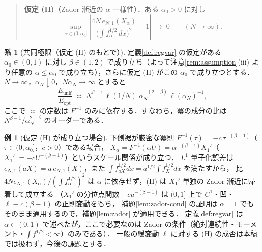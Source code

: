 \documentclass[a4paper,10pt]{jsarticle}
\theoremstyle{definition}
\newtheorem{corollary}{系}[section]
\newtheorem{example}{例}[section]
\newcommand{\Finv}{F^{-1}}
\newcommand{\eN}{e_{N,1}}
\newcommand{\Eunif}{E_{\mathrm{unif}}}
\newcommand{\Eopt}{E_{\mathrm{opt}}}
\begin{document}
\begin{quote}
\textbf{仮定 (H)}（Zador 漸近の $\alpha$ 一様性）．ある $\alpha_0>0$ に対し
\begin{equation*}
  \sup_{\alpha\in(0,\alpha_0]}\left|\frac{4N\,\eN(X_\alpha)}{\bigl(\int f_\alpha^{1/2}\,dx\bigr)^{2}}-1\right|\;\longrightarrow\;0\qquad(N\to\infty).
\end{equation*}
\end{quote}

\begin{corollary}[共同極限（仮定 (H) のもとで）]
\label{cor:joint}
定義\ref{def:regvar} の仮定がある $\alpha_0\in(0,1)$ に対し $\beta\in(1,2)$ で成り立ち（よって注意\ref{rem:assumption}(iii) より任意の $\alpha\le\alpha_0$ で成り立ち），さらに仮定 (H) がこの $\alpha_0$ で成り立つとする．
$N\to\infty$，$\alpha_N\downarrow0$，$N\alpha_N\to\infty$ とすると
\begin{equation}
  \frac{\Eunif}{\Eopt}
  \;\asymp\;N^{\beta-1}\,\ell(1/N)\;\alpha_N^{-(2-\beta)}\,\ell(\alpha_N)^{-1},
  \label{eq:conj-scaling2}
\end{equation}
ここで $\asymp$ の定数は $\Finv$ のみに依存する．すなわち，冪の成分の比は $N^{\beta-1}/\alpha_N^{2-\beta}$ のオーダーである．
\end{corollary}

\begin{example}[仮定 (H) が成り立つ場合]
\label{ex:powertail}
下側裾が厳密な冪則 $\Finv(\tau)=-c\,\tau^{-(\beta-1)}$（$\tau\in(0,\alpha_0]$，$c>0$）である場合，
$X_\alpha=\Finv(\alpha U)=\alpha^{-(\beta-1)}X_1'$（$X_1':=-cU^{-(\beta-1)}$）というスケール関係が成り立つ．
$L^1$ 量子化誤差は $\eN(aX)=a\,\eN(X)$，また $\int f_{aX}^{1/2}dx=a^{1/2}\int f_X^{1/2}dx$ を満たすから，
比 $4N\eN(X_\alpha)/(\int f_\alpha^{1/2})^2$ は $\alpha$ に依存せず，(H) は $X_1'$ 単独の Zador 漸近に帰着して成立する
（$X_1'$ の分位点関数 $-cu^{-(\beta-1)}$ は $(0,1]$ 上で $C^1$・凹・$\ell\equiv c(\beta-1)$ の正則変動をもち，
補題\ref{lem:zador-cond} の証明は $\alpha=1$ でもそのまま通用するので，補題\ref{lem:zador} が適用できる．
定義\ref{def:regvar} は $\alpha\in(0,1)$ で述べたが，ここで必要なのは Zador の条件（絶対連続性・モーメント・$\int f^{1/2}<\infty$）のみである）．
一般の緩変動 $\ell$ に対する (H) の成否は本稿では扱わず，今後の課題とする．
\end{example}
\end{document}
